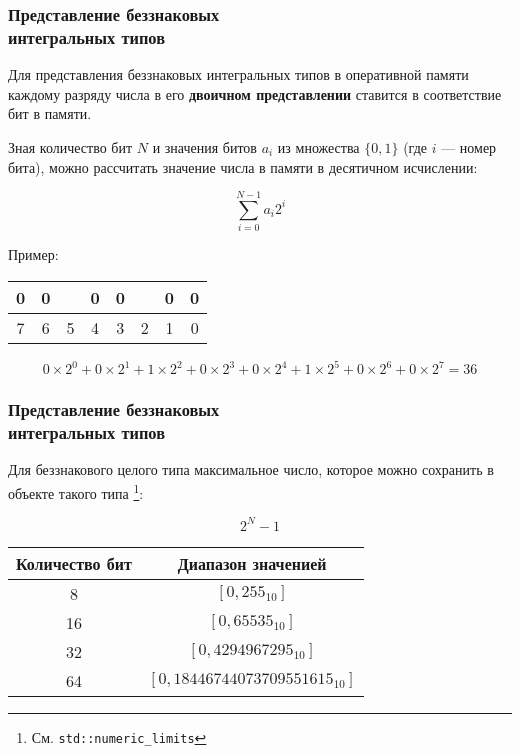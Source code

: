 \documentclass[compress, 8pt]{beamer}
\newenvironment{eightbit}{%
    \begin{center}
        \begin{tabular}{ |m{0.2cm}|m{0.2cm}|m{0.2cm}|m{0.2cm}|m{0.2cm}|m{0.2cm}|m{0.2cm}|m{0.2cm}|  }
            \hline
}{
        \hline
        \multicolumn{1}{c}{\color{gray}\tiny{7}} &
        \multicolumn{1}{c}{\color{gray}\tiny{6}} &
        \multicolumn{1}{c}{\color{gray}\tiny{5}} &
        \multicolumn{1}{c}{\color{gray}\tiny{4}} &
        \multicolumn{1}{c}{\color{gray}\tiny{3}} &
        \multicolumn{1}{c}{\color{gray}\tiny{2}} &
        \multicolumn{1}{c}{\color{gray}\tiny{1}} &
        \multicolumn{1}{c}{\color{gray}\tiny{0}} \\
        \end{tabular}
    \end{center}
}
\begin{document}
\begin{frame}[fragile]

    \frametitle{Представление беззнаковых \\ интегральных типов}

    Для представления беззнаковых интегральных типов в оперативной
    памяти каждому разряду числа в его \textbf{двоичном представлении}
    ставится в соответствие бит в памяти.

    \hfill \break
    Зная количество бит \(N\) и значения битов \(a_i\) из множества
    \(\{0,1\}\) (где \(i\) --- номер бита), можно рассчитать значение
    числа в памяти в десятичном исчислении:

    \begin{displaymath}
\sum_{i=0}^{N-1}{a_i 2^i}
    \end{displaymath}

    Пример:

    \begin{eightbit}
        0 & 0 & \cellcolor{gray}{1} & 0 & 0 & \cellcolor{gray}{1} & 0 & 0 \\
    \end{eightbit}

    \begin{displaymath}
0 \times 2^0 + 0 \times 2^1 + 1 \times 2^2 + 0 \times 2^3 + 0 \times 2^4
        + 1 \times 2^5 + 0 \times 2^6 + 0 \times 2^7 = 36
    \end{displaymath}

\end{frame}

\begin{frame}[fragile]

    \frametitle{Представление беззнаковых \\ интегральных типов}

    Для беззнакового целого типа максимальное число, которое можно
    сохранить в объекте такого типа
    \footnote{См. \texttt{std::numeric\_limits}}:

    \begin{displaymath}
2^N-1
    \end{displaymath}

    \hfill \break

    \begin{center}
        \begin{tabular}{|c|c|}
            \hline
            Количество бит & Диапазон значенией \\
            \hline
            \hline
            8 & \([0,255_{10}]\) \\
            16 & \([0,65535_{10}]\) \\
            32 & \([0,4294967295_{10}]\) \\
            64 & \([0,18446744073709551615_{10}]\) \\
            \hline
        \end{tabular}
    \end{center}

\end{frame}
\end{document}
